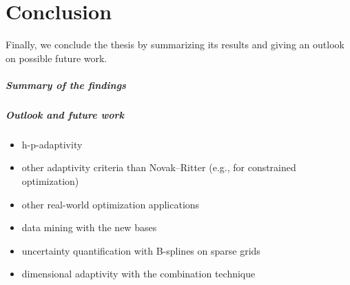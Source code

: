 \chapter{Conclusion}
\label{chap:90conclusion}

\noindent
Finally, we conclude the thesis by summarizing its results
and giving an outlook on possible future work.

\paragraph{Summary of the findings}

\blindtext{}

\paragraph{Outlook and future work}

\blindtext{}

\begin{itemize}
  \item
  h-p-adaptivity
  
  \item
  other adaptivity criteria than Novak--Ritter
  (e.g., for constrained optimization)
  
  \item
  other real-world optimization applications
  
  \item
  data mining with the new bases
  
  \item
  uncertainty quantification with B-splines on sparse grids
  
  \item
  dimensional adaptivity with the combination technique
\end{itemize}

\cleardoublepage
